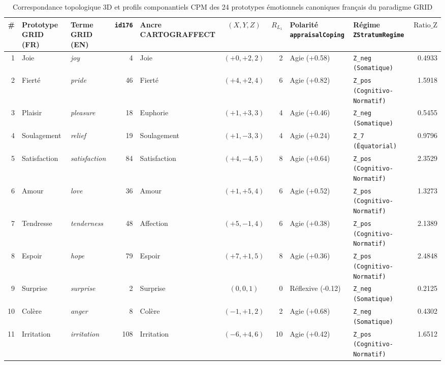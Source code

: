 \begin{table}[htbp]
\centering
\begin{threeparttable}
\caption{Correspondance topologique 3D et profils componantiels CPM des 24 prototypes émotionnels canoniques français du paradigme GRID}
\label{tab:cartograffect_grid24_correspondence}
\footnotesize
\begin{tabular}{r l l r l c r l l r}
\toprule
\# & Prototype GRID (FR) & Terme GRID (EN) & \texttt{id176} & Ancre CARTOGRAFFECT & $(X, Y, Z)$ & $R_{L_1}$ & Polarité \texttt{appraisalCoping} & Régime \texttt{ZStratumRegime} & $\text{Ratio\_Z}$ \\
\midrule
1 & Joie & \textit{joy} & 4 & Joie & $(+0, +2, 2)$ & 2 & Agie (+0.58) & \texttt{Z\_neg (Somatique)} & 0.4933 \\
2 & Fierté & \textit{pride} & 46 & Fierté & $(+4, +2, 4)$ & 6 & Agie (+0.82) & \texttt{Z\_pos (Cognitivo-Normatif)} & 1.5918 \\
3 & Plaisir & \textit{pleasure} & 18 & Euphorie & $(+1, +3, 3)$ & 4 & Agie (+0.46) & \texttt{Z\_neg (Somatique)} & 0.5455 \\
4 & Soulagement & \textit{relief} & 19 & Soulagement & $(+1, -3, 3)$ & 4 & Agie (+0.24) & \texttt{Z\_7 (Équatorial)} & 0.9796 \\
5 & Satisfaction & \textit{satisfaction} & 84 & Satisfaction & $(+4, -4, 5)$ & 8 & Agie (+0.64) & \texttt{Z\_pos (Cognitivo-Normatif)} & 2.3529 \\
6 & Amour & \textit{love} & 36 & Amour & $(+1, +5, 4)$ & 6 & Agie (+0.52) & \texttt{Z\_pos (Cognitivo-Normatif)} & 1.3273 \\
7 & Tendresse & \textit{tenderness} & 48 & Affection & $(+5, -1, 4)$ & 6 & Agie (+0.38) & \texttt{Z\_pos (Cognitivo-Normatif)} & 2.1389 \\
8 & Espoir & \textit{hope} & 79 & Espoir & $(+7, +1, 5)$ & 8 & Agie (+0.36) & \texttt{Z\_pos (Cognitivo-Normatif)} & 2.4848 \\
9 & Surprise & \textit{surprise} & 2 & Surprise & $(0, 0, 1)$ & 0 & Réflexive (-0.12) & \texttt{Z\_neg (Somatique)} & 0.2125 \\
10 & Colère & \textit{anger} & 8 & Colère & $(-1, +1, 2)$ & 2 & Agie (+0.68) & \texttt{Z\_neg (Somatique)} & 0.4302 \\
11 & Irritation & \textit{irritation} & 108 & Irritation & $(-6, +4, 6)$ & 10 & Agie (+0.42) & \texttt{Z\_pos (Cognitivo-Normatif)} & 1.6512 \\

\end{tabular}
\end{threeparttable}
\end{table}
